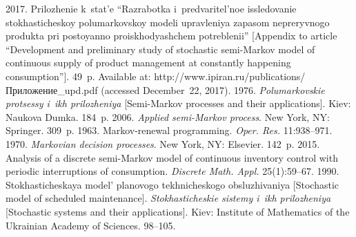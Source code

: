   







  \begin{multicols}{2}

\renewcommand{\bibname}{\protect\rmfamily References}

{\small\frenchspacing
 {%
 \begin{thebibliography}{99} 
   2017. Prilozhenie k~stat'e 
``Razrabotka i~predvaritel'noe issle\-do\-va\-nie\linebreak
 stokhasticheskoy polumarkovskoy 
modeli uprav\-le\-niya\linebreak
 zapasom nepreryvnogo produkta pri po\-sto\-yan\-no 
pro\-is\-kho\-dya\-shchem potreblenii'' [Appendix to article ``Development and preliminary 
study of stochastic semi-Markov model of continuous supply of product management at 
constantly happening consumption'']. 49~p. Available at: {\sf 
http://www.ipiran.ru/publications/\linebreak Приложение\_upd.pdf} (accessed December~22, 2017).
   1976. \textit{Polumarkovskie 
protsessy i~ikh prilozheniya} [Semi-Markov processes and their applications]. Kiev: 
Naukova Dumka. 184~p.
   2006. \textit{Applied semi-Markov process}. 
New York, NY: Springer. 309~p.
   1963. Markov-renewal programming. \textit{Oper. Res.}  
11:938--971.
   1970. \textit{Markovian decision processes}. New 
York, NY: Elsevier. 142~p.
   2015. Analysis of a discrete  
semi-Markov model of continuous inventory control with periodic interruptions of 
consumption. \textit{Discrete Math. Appl.} 25(1):59--67.
    1990. Stokhasticheskaya model' 
  planovogo tekhnicheskogo obsluzhivaniya [Stochastic model of scheduled maintenance]. 
  \textit{Stokhasticheskie sis\-te\-my i~ikh prilozheniya} 
  [Stochastic systems and their applications]. 
  Kiev: Institute of Mathematics of the Ukrainian Academy of Sciences. 98--105.


\end{thebibliography}}}
\end{multicols}
